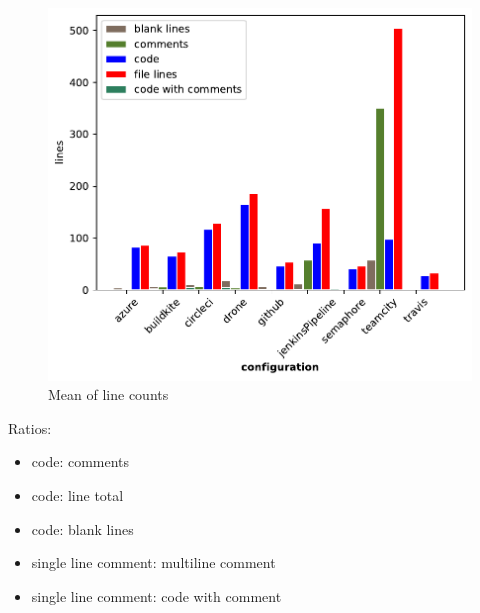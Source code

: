 \documentclass[twoside,12pt,titlepage,a4paper]{article}
\begin{document}
\begin{figure}[!ht]
  \centering
  \includegraphics[width=\textwidth]{../src/results/basic comments bars.pdf}
  \caption[alt text]{Mean of line counts}
  \label{fig:bar_comments_lines}
\end{figure}

Ratios:
\begin{itemize}
  \item{code: comments}
  \item{code: line total}
  \item{code: blank lines}
  \item{single line comment: multiline comment}
  \item{single line comment: code with comment}
\end{itemize}
\end{document}
